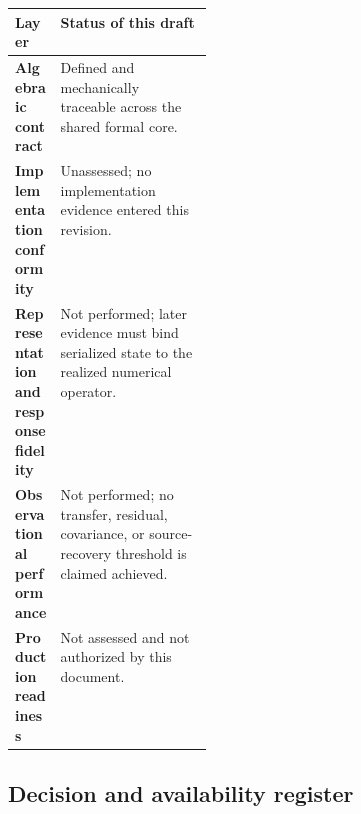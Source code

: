 \documentclass[11pt]{article}
\begin{document}
\begin{table}[htbp]
\centering
\small
\begin{tabularx}{\linewidth}{>{\raggedright\arraybackslash\bfseries}p{0.23\linewidth}X}
\toprule
Layer & Status of this draft \\
\midrule
Algebraic contract & Defined and mechanically traceable across the shared formal core.\\
Implementation conformity & Unassessed; no implementation evidence entered this revision.\\
Representation and response fidelity & Not performed; later evidence must bind serialized state to the realized numerical operator.\\
Observational performance & Not performed; no transfer, residual, covariance, or source-recovery threshold is claimed achieved.\\
Production readiness & Not assessed and not authorized by this document.\\
\bottomrule
\end{tabularx}
\end{table}

\Needspace{0.16\textheight}
\subsection{Decision and availability register}
\end{document}
